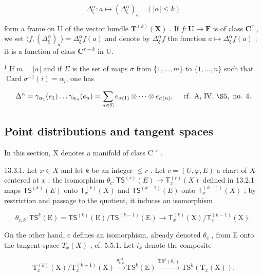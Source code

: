 \[
\Delta_ {\xi} ^ {\alpha}: a \mapsto (\Delta_ {\xi} ^ {\alpha}) _ {a} \quad (| \alpha | \leqslant k)
\]

form a frame on U of the vector bundle \(\mathbf{T}^{(k)}(\mathbf{X})\) . If \(f\colon \mathbf{U}\to \mathbf{F}\) is of class \(\mathbf{C}^r\) , we set \(\langle f, (\Delta_{\xi}^{\alpha})_a\rangle = \Delta_{\xi}^{\alpha}f(a)\) and denote by \(\Delta_{\xi}^{\alpha}f\) the function \(a\mapsto \Delta_{\xi}^{\alpha}f(a)\) ; it is a function of class \(\mathbf{C}^{r - k}\) in U.

\(^{1}\) If \(m = |\alpha|\) and if \(\Sigma\) is the set of maps \(\sigma\) from \(\{1, \ldots, m\}\) to \(\{1, \ldots, n\}\) such that \(\operatorname{Card}\sigma^{-1}(i)=\alpha_i\), one has

\[
\Delta^ {\alpha} = \gamma_{\alpha_1}(e_1) \dots \gamma_{\alpha_n}(e_n) = \sum_{\sigma \in \Sigma} e_{\sigma(1)} \otimes \dots \otimes e_{\sigma(n)}, \quad \text { cf. A, IV, } \S 5, \text { no. } 4.
\]

\subsection{Point distributions and tangent spaces}

In this section, X denotes a manifold of class C \(^{r}\) .

13.3.1. Let \(x \in X\) and let \(k\) be an integer \(\leqslant r\) . Let \(c = (U, \varphi, E)\) a chart of \(X\) centered at \(x\) ; the isomorphism \(\theta_c \colon \mathsf{TS}^{(r)}(E) \to \mathsf{T}_x^{(r)}(X)\) defined in 13.2.1 maps \(\mathsf{TS}^{(k)}(E)\) onto \(\mathsf{T}_x^{(k)}(X)\) and \(\mathsf{TS}^{(k-1)}(E)\) onto \(\mathsf{T}_x^{(k-1)}(X)\) ; by restriction and passage to the quotient, it induces an isomorphism

\[
\theta_ {c, k} \colon \mathsf {T S} ^ {k} (\mathrm{E}) = \mathsf {T S} ^ {(k)} (\mathrm{E}) / \mathsf {T S} ^ {(k - 1)} (\mathrm{E}) \rightarrow \mathsf {T} _ {x} ^ {(k)} (\mathrm{X}) / \mathsf {T} _ {x} ^ {(k - 1)} (\mathrm{X}).
\]

On the other hand, c defines an isomorphism, already denoted \(\theta_{c}\) , from E onto the tangent space \(T_{x}(X)\) , cf. 5.5.1. Let \(i_{k}\) denote the composite

\[
\mathrm{T} _ {x} ^ {(k)} (\mathrm{X}) / \mathrm{T} _ {x} ^ {(k - 1)} (\mathrm{X}) \xrightarrow {\theta_ {c , k} ^ {- 1}} \mathrm{TS} ^ {k} (\mathrm{E}) \xrightarrow {\mathrm{TS} ^ {k} (\theta_ {c})} \mathrm{TS} ^ {k} (\mathrm{T} _ {x} (\mathrm{X})).
\]

